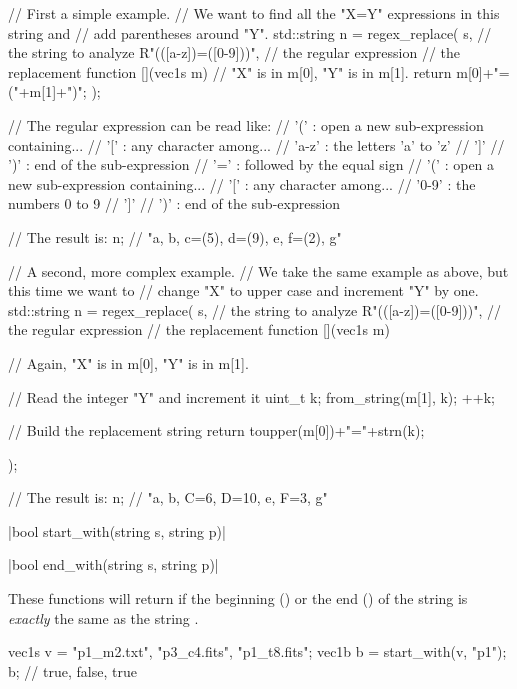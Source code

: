 {\begin{example}
\begin{cppcode}
// First a simple example.
// We want to find all the "X=Y" expressions in this string and
// add parentheses around "Y".
std::string n = regex_replace(
    s,                    // the string to analyze
    R"(([a-z])=([0-9]))", // the regular expression
    // the replacement function
    [](vec1s m) {
        // "X" is in m[0], "Y" is in m[1].
        return m[0]+"=("+m[1]+")";
    }
);

// The regular expression can be read like:
// '('   : open a new sub-expression containing...
// '['   : any character among...
// 'a-z' : the letters 'a' to 'z'
// ']'
// ')'   : end of the sub-expression
// '='   : followed by the equal sign
// '('   : open a new sub-expression containing...
// '['   : any character among...
// '0-9' : the numbers 0 to 9
// ']'
// ')'   : end of the sub-expression

// The result is:
n; // "a, b, c=(5), d=(9), e, f=(2), g"

// A second, more complex example.
// We take the same example as above, but this time we want to
// change "X" to upper case and increment "Y" by one.
std::string n = regex_replace(
    s,                    // the string to analyze
    R"(([a-z])=([0-9]))", // the regular expression
    // the replacement function
    [](vec1s m) {
        // Again, "X" is in m[0], "Y" is in m[1].

        // Read the integer "Y" and increment it
        uint_t k;
        from_string(m[1], k);
        ++k;

        // Build the replacement string
        return toupper(m[0])+"="+strn(k);
    }
);

// The result is:
n; // "a, b, C=6, D=10, e, F=3, g"
\end{cppcode}
\end{example}

\funcitem \vectorfunc \cppinline|bool start_with(string s, string p)| 

\vectorfunc \cppinline|bool end_with(string s, string p)| 

These functions will return \cpptrue if the beginning () or the end () of the string  is \emph{exactly} the same as the string .

\begin{example}
\begin{cppcode}
vec1s v = {"p1_m2.txt", "p3_c4.fits", "p1_t8.fits"};
vec1b b = start_with(v, "p1");
b; // {true, false, true}


\end{cppcode}
\end{example}}
